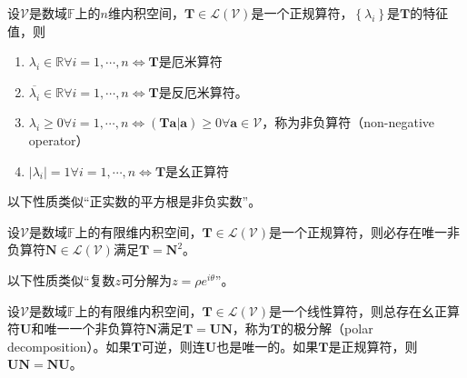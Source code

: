 \documentclass[main.tex]{subfiles}
\begin{document}
\begin{theorem}
设$\mathcal{V}$是数域$\mathbb{F}$上的$n$维内积空间，$\mathbf{T}\in\mathcal{L}\left(\mathcal{V}\right)$是一个正规算符，$\left\{\lambda_i\right\}$是$\mathbf{T}$的特征值，则
\begin{enumerate}
    \item $\lambda_i\in\mathbb{R}\forall i=1,\cdots,n\Leftrightarrow\mathbf{T}$是厄米算符
    \item $\overline{\lambda_i}\in\mathbb{R}\forall i=1,\cdots,n\Leftrightarrow\mathbf{T}$是反厄米算符。
    \item $\lambda_i\geq 0\forall i=1,\cdots,n\Leftrightarrow\left(\mathbf{Ta}|\mathbf{a}\right)\geq0\forall\mathbf{a}\in\mathcal{V}$，称为非负算符（non-negative operator）
    \item $\left|\lambda_i\right|=1\forall i=1,\cdots,n\Leftrightarrow\mathbf{T}$是幺正算符
\end{enumerate}
\end{theorem}

以下性质类似“正实数的平方根是非负实数”。

\begin{theorem}
设$\mathcal{V}$是数域$\mathbb{F}$上的有限维内积空间，$\mathbf{T}\in\mathcal{L}\left(\mathcal{V}\right)$是一个正规算符，则必存在唯一非负算符$\mathbf{N}\in\mathcal{L}\left(\mathcal{V}\right)$满足$\mathbf{T}=\mathbf{N}^2$。
\end{theorem}

以下性质类似“复数$z$可分解为$z=\rho e^{i\theta}$”。

\begin{theorem}
设$\mathcal{V}$是数域$\mathbb{F}$上的有限维内积空间，$\mathbf{T}\in\mathcal{L}\left(\mathcal{V}\right)$是一个线性算符，则总存在幺正算符$\mathbf{U}$和唯一一个非负算符$\mathbf{N}$满足$\mathbf{T}=\mathbf{UN}$，称为$\mathbf{T}$的极分解（polar decomposition）。如果$\mathbf{T}$可逆，则连$\mathbf{U}$也是唯一的。如果$\mathbf{T}$是正规算符，则$\mathbf{UN}=\mathbf{NU}$。
\end{theorem}
\end{document}
